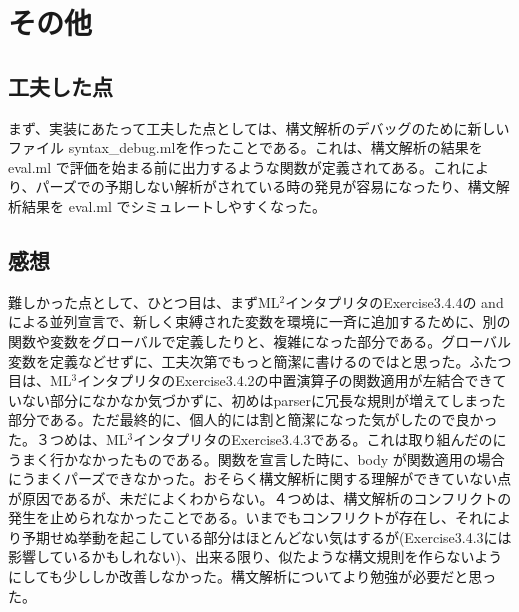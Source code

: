 \documentclass{jreport}
\begin{document}
              \chapter{その他}
                        \section{工夫した点}
                        まず、実装にあたって工夫した点としては、構文解析のデバッグのために新しいファイル syntax\_debug.mlを作ったことである。これは、構文解析の結果を eval.ml で評価を始まる前に出力するような関数が定義されてある。これにより、パーズでの予期しない解析がされている時の発見が容易になったり、構文解析結果を eval.ml でシミュレートしやすくなった。
                        \section{感想}
                        難しかった点として、ひとつ目は、まずML$^2$インタプリタのExercise3.4.4の and による並列宣言で、新しく束縛された変数を環境に一斉に追加するために、別の関数や変数をグローバルで定義したりと、複雑になった部分である。グローバル変数を定義などせずに、工夫次第でもっと簡潔に書けるのではと思った。ふたつ目は、ML$^3$インタプリタのExercise3.4.2の中置演算子の関数適用が左結合できていない部分になかなか気づかずに、初めはparserに冗長な規則が増えてしまった部分である。ただ最終的に、個人的には割と簡潔になった気がしたので良かった。３つめは、ML$^3$インタプリタのExercise3.4.3である。これは取り組んだのにうまく行かなかったものである。関数を宣言した時に、body が関数適用の場合にうまくパーズできなかった。おそらく構文解析に関する理解ができていない点が原因であるが、未だによくわからない。４つめは、構文解析のコンフリクトの発生を止められなかったことである。いまでもコンフリクトが存在し、それにより予期せぬ挙動を起こしている部分はほとんどない気はするが(Exercise3.4.3には影響しているかもしれない)、出来る限り、似たような構文規則を作らないようにしても少ししか改善しなかった。構文解析についてより勉強が必要だと思った。
\end{document}
